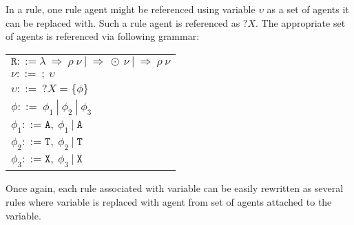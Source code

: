 \documentclass{entcs}
\renewcommand{\~}[0]{\texttildelow}
\begin{document}
In a rule, one rule agent might be referenced using variable $\upsilon$ as a set of agents it can be replaced with. Such a rule agent is referenced as $?X$. The appropriate set of agents is referenced via following grammar: 

\begin{center}
{\small
\hspace*{-1cm}\begin{tabular}{ l }
$\mathtt{R} ::= \lambda ~\Rightarrow~ \rho~\nu ~|~ \Rightarrow ~\odot~\nu ~|~ \Rightarrow~ \rho~\nu $\\
$\nu ::=~ ;~\upsilon$\\
$\upsilon ::=~?X = \{\phi\}$\\
$\phi ::=~\phi_1~|~\phi_2~|~\phi_3$\\
$\phi_1 ::= \mathtt{A},~\phi_1~|~\mathtt{A}$\\
$\phi_2 ::= \mathtt{T},~\phi_2~|~\mathtt{T}$\\
$\phi_3 ::= \mathtt{X},~\phi_3~|~\mathtt{X}$\\
\end{tabular}
}
\end{center}

Once again, each rule associated with variable can be easily rewritten as several rules where variable is replaced with agent from set of agents attached to the variable.
\end{document}
